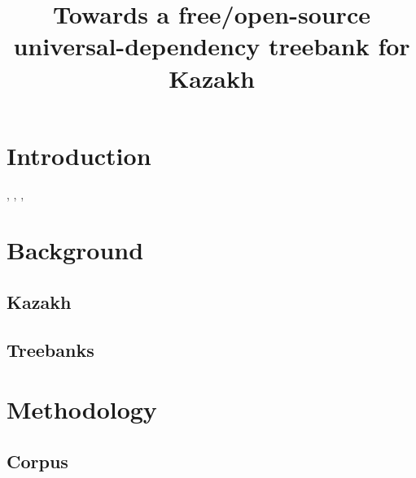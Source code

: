 \documentclass[a4paper,11pt, onecolumn]{article}
\title{Towards a free/open-source universal-dependency treebank for Kazakh}
\begin{document}
\maketitleabstract{}
\thispagestyle{firststyle}

\section{Introduction}

\citet{Lynn12}, \citet{Atalay03}, \citet{Oflazer03}, \citet{DeMarneffe14}

\section{Background}

\subsection{Kazakh}


\subsection{Treebanks} %


\section{Methodology}

\subsection{Corpus}
\end{document}
